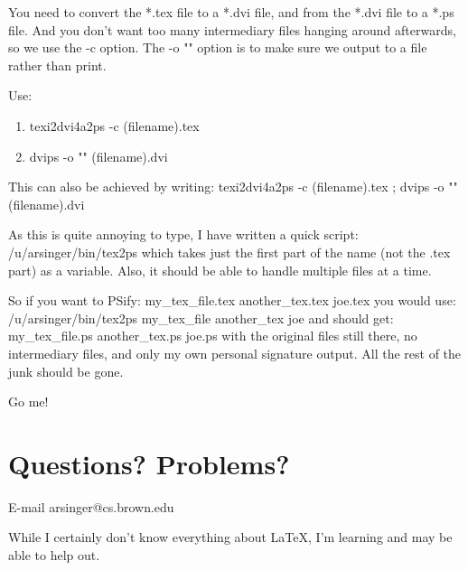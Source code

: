 \documentclass[a4paper,12pt]{article}
\begin{document}
You need to convert the *.tex file to a *.dvi file, and from the *.dvi file 
to a *.ps file. And you don't want too many intermediary files hanging around
afterwards, so we use the -c option. The -o "" option is to make sure we
output to a file rather than print.

Use:
\begin{enumerate}
\item texi2dvi4a2ps -c (filename).tex
\item dvips -o "" (filename).dvi
\end{enumerate}

This can also be achieved by writing:
texi2dvi4a2ps -c (filename).tex ; dvips -o "" (filename).dvi

As this is quite annoying to type, I have written a quick script:
/u/arsinger/bin/tex2ps
which takes just the first part of the name (not the .tex part) as a
variable. Also, it should be able to handle multiple files at a time.

So if you want to PSify:
my\_tex\_file.tex another\_tex.tex joe.tex
you would use:
/u/arsinger/bin/tex2ps my\_tex\_file another\_tex joe
and should get:
my\_tex\_file.ps another\_tex.ps joe.ps
with the original files still there, no intermediary files, and only
my own personal signature output. All the rest of the junk should be gone.

Go me!

\section*{Questions? Problems?}

E-mail arsinger@cs.brown.edu

While I certainly don't know everything about LaTeX, I'm learning and may be
able to help out.
\end{document}
